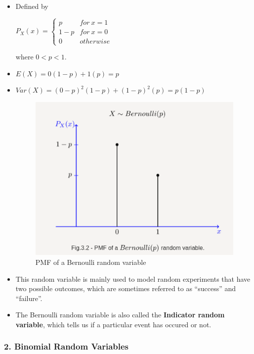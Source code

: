 \begin{itemize}
\item
  Defined by

  \(P_X(x) = \begin{cases}p & for \ x=1\\1-p & for\ x=0\\0 & otherwise\end{cases}\)

  where \(0 < p < 1\).
\item
  \(E(X) = 0(1-p) + 1(p) = p\)
\item
  \(Var(X) = (0-p)^2(1-p) + (1-p)^2(p) = p(1-p)\)

  \begin{figure}
  \centering
  \includegraphics{Lecture 13 Notes e842fef9a3e0449fa78bac59b75dbc5c/Screenshot_from_2021-08-06_23-12-43.png}
  \caption{PMF of a Bernoulli random variable}
  \end{figure}
\item
  This random variable is mainly used to model random experiments that
  have two possible outcomes, which are sometimes referred to as
  ``success'' and ``failure''.
\item
  The Bernoulli random variable is also called the \textbf{Indicator
  random variable}, which tells us if a particular event has occured or
  not.
\end{itemize}

\hypertarget{binomial-random-variables}{%
\subsubsection{2. Binomial Random
Variables}\label{binomial-random-variables}}

